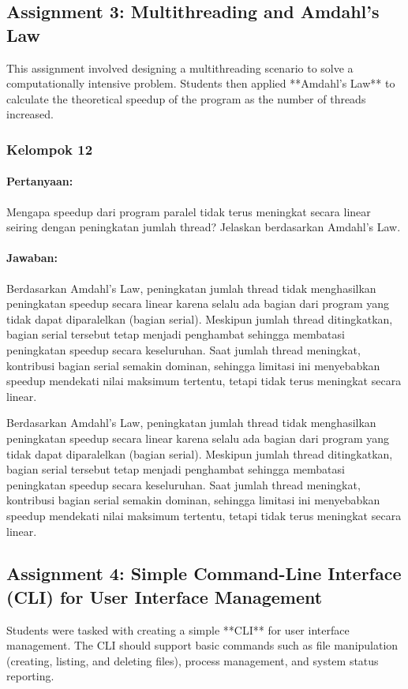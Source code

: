 \documentclass[12pt]{article}
\begin{document}
\subsection{Assignment 3: Multithreading and Amdahl's Law}
This assignment involved designing a multithreading scenario to solve a computationally intensive problem. Students then applied **Amdahl's Law** to calculate the theoretical speedup of the program as the number of threads increased.
\subsubsection{Kelompok 12}
\paragraph{Pertanyaan:} Mengapa speedup dari program paralel tidak terus meningkat secara linear seiring dengan peningkatan jumlah thread? Jelaskan berdasarkan Amdahl's Law.

\paragraph{Jawaban:} Berdasarkan Amdahl's Law, peningkatan jumlah thread tidak menghasilkan peningkatan speedup secara linear karena selalu ada bagian dari program yang tidak dapat diparalelkan (bagian serial). Meskipun jumlah thread ditingkatkan, bagian serial tersebut tetap menjadi penghambat sehingga membatasi peningkatan speedup secara keseluruhan. Saat jumlah thread meningkat, kontribusi bagian serial semakin dominan, sehingga limitasi ini menyebabkan speedup mendekati nilai maksimum tertentu, tetapi tidak terus meningkat secara linear.

Berdasarkan Amdahl's Law, peningkatan jumlah thread tidak menghasilkan peningkatan speedup secara linear karena selalu ada bagian dari program yang tidak dapat diparalelkan (bagian serial). Meskipun jumlah thread ditingkatkan, bagian serial tersebut tetap menjadi penghambat sehingga membatasi peningkatan speedup secara keseluruhan. Saat jumlah thread meningkat, kontribusi bagian serial semakin dominan, sehingga limitasi ini menyebabkan speedup mendekati nilai maksimum tertentu, tetapi tidak terus meningkat secara linear.


\subsection{Assignment 4: Simple Command-Line Interface (CLI) for User Interface Management}
Students were tasked with creating a simple **CLI** for user interface management. The CLI should support basic commands such as file manipulation (creating, listing, and deleting files), process management, and system status reporting.
\end{document}
